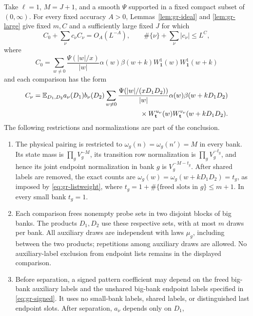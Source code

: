 \begin{proposition}
Take \(\ell=1\), \(M=J+1\), and a smooth \(\Psi\) supported
in a fixed compact subset of \((0,\infty)\). For every fixed
accuracy \(A>0\), Lemmas~\ref{lem:gr-ideal} and
\ref{lem:gr-large} give fixed \(m,C\) and a sufficiently large
fixed \(J\) for which
\begin{equation}
 C_0+\sum_\nu c_\nu C_\nu=O_A(L^{-A}),\qquad
 \#\{\nu\}+\sum_\nu|c_\nu|\le L^{C},                  \label{eq:gr-comparison}
\end{equation}
where
\[
 C_0=\sum_{w\ne0}\frac{\Psi(|w|/x)}{|w|}
       \alpha(w)\beta(w+k)
       W_{\mathbf1}^1(w)W_{\mathbf1}^1(w+k)
\]
and each comparison has the form
\begin{equation}
 \begin{split}
 C_\nu=\mathbb E_{D_1,D_2}a_\nu(D_1)b_\nu(D_2)
 \sum_{w\ne0}\frac{\Psi(|w|/(xD_1D_2))}{|w|}
  \alpha(w)\beta(w+kD_1D_2)\\
 {}\times W_{\mathbf t}^{u_\nu}(w)
                  W_{\mathbf t}^{v_\nu}(w+kD_1D_2).
 \end{split}                                                     \label{eq:gr-comparison-term}
\end{equation}
The following restrictions and normalizations are part of the conclusion.
\begin{enumerate}
\item The physical pairing is restricted to
\(\omega_g(n)=\omega_g(n')=M\) in every bank. Its state mass is
\(\prod_gV_g^{-M}\), its transition row normalization is
\(\prod_gV_g^{-t_g}\), and hence its joint endpoint normalization
in bank \(g\) is \(V_g^{-M-t_g}\). After shared labels are removed,
the exact counts are \(\omega_g(w)=\omega_g(w+kD_1D_2)=t_g\),
as imposed by \eqref{eq:gr-listweight}, where
\(t_g=1+\#\{\text{freed slots in }g\}\le m+1\).
In every small bank \(t_g=1\).
\item Each comparison frees nonempty probe sets in two disjoint
blocks of big banks. The products \(D_1,D_2\) use these respective
sets, with at most \(m\) draws per bank. All auxiliary draws are
independent with laws \(\mu_g\), including between the two products;
repetitions among auxiliary draws are allowed. No auxiliary-label
exclusion from endpoint lists remains in the displayed comparison.
\item Before separation, a signed pattern coefficient may depend
on the freed big-bank auxiliary labels and the unshared big-bank
endpoint labels specified in \eqref{eq:gr-signed}. It uses no small-bank
labels, shared labels, or distinguished last endpoint slots.
After separation, \(a_\nu\) depends only on \(D_1\),

\end{enumerate}
\end{proposition}
